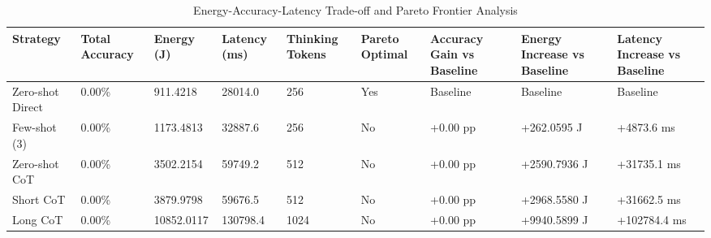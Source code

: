 \begin{table}
\caption{Energy-Accuracy-Latency Trade-off and Pareto Frontier Analysis}
\label{tab:tradeoff_comparison}
\begin{tabular}{lllllllll}
\toprule
Strategy & Total Accuracy & Energy (J) & Latency (ms) & Thinking Tokens & Pareto Optimal & Accuracy Gain vs Baseline & Energy Increase vs Baseline & Latency Increase vs Baseline \\
\midrule
Zero-shot Direct & 0.00\% & 911.4218 & 28014.0 & 256 & Yes & Baseline & Baseline & Baseline \\
Few-shot (3) & 0.00\% & 1173.4813 & 32887.6 & 256 & No & +0.00 pp & +262.0595 J & +4873.6 ms \\
Zero-shot CoT & 0.00\% & 3502.2154 & 59749.2 & 512 & No & +0.00 pp & +2590.7936 J & +31735.1 ms \\
Short CoT & 0.00\% & 3879.9798 & 59676.5 & 512 & No & +0.00 pp & +2968.5580 J & +31662.5 ms \\
Long CoT & 0.00\% & 10852.0117 & 130798.4 & 1024 & No & +0.00 pp & +9940.5899 J & +102784.4 ms \\
\bottomrule
\end{tabular}
\end{table}
